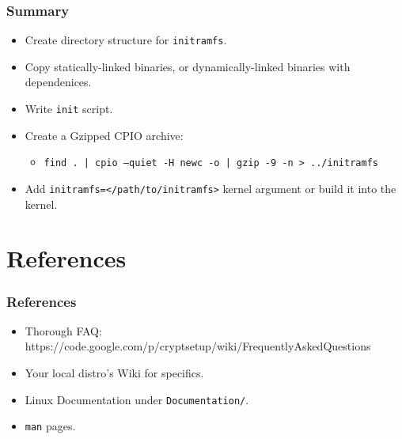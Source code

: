 \documentclass[xcolor={dvipsnames,svgnames},hyperref=dvips]{beamer}
\begin{document}
	\begin{frame}
		\frametitle{Summary}
		\begin{itemize}
		\item Create directory structure for \texttt{initramfs}.
		\item Copy statically-linked binaries, or dynamically-linked binaries with dependenices.
		\item Write \texttt{init} script.
		\item Create a Gzipped CPIO archive:
			\begin{itemize}
			\item \texttt{find . | cpio --quiet -H newc -o | gzip -9 -n > ../initramfs}
			\end{itemize}
		\item Add \texttt{initramfs=</path/to/initramfs>} kernel argument or build it into the kernel.
		\end{itemize}
	\end{frame}


\section{References}
\begin{frame}
	\frametitle{References}
	\begin{itemize}
	\item Thorough FAQ: https://code.google.com/p/cryptsetup/wiki/FrequentlyAskedQuestions
	\item Your local distro's Wiki for specifics.
	\item Linux Documentation under \texttt{Documentation/}.
	\item \texttt{man} pages.
	\end{itemize}
\end{frame}
\end{document}

